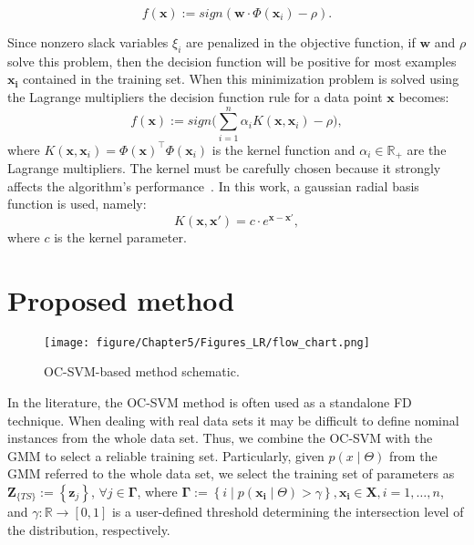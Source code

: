 \begin{equation}\label{eqn:decisor}
    f(\mathbf{x}) := sign(\mathbf{w} \cdot \Phi(\mathbf{x}_i)-\rho).
\end{equation}

Since nonzero slack variables $\xi_i$ are penalized in the objective function, if $\mathbf{w}$ and $\rho$ solve this problem, then the decision function will be positive for most examples $\mathbf{x_i}$ contained in the training set. When this minimization problem is solved using the Lagrange multipliers the decision function rule for a data point $\mathbf{x}$ becomes:
\begin{equation}\label{eqn:decisorLagrange}
f(\mathbf{x}) := sign\biggr(\sum_{i=1}^n \alpha_i K(\mathbf{x},\mathbf{x}_i)-\rho\biggl),
\end{equation}
where $K(\mathbf{x},\mathbf{x}_i)=\Phi(\mathbf{x})^{\top} \Phi(\mathbf{x}_i)$ is the kernel function and $\alpha_i \in \mathbb{R}_{+}$ are the Lagrange multipliers. The kernel must be carefully chosen because it strongly affects the algorithm's performance~\cite{muller2018introduction}. In this work, a gaussian radial basis function is used, namely:
\begin{equation*}
    K(\mathbf{x},\mathbf{x'})= c \cdot e^{{\mathbf{x}-\mathbf{x}'}},
\end{equation*}
where $c$ is the kernel parameter.
\section{Proposed method}
\begin{figure*}[ht!]
    \centering
    \texttt{[image: figure/Chapter5/Figures\_LR/flow\_chart.png]}
    \caption{OC-SVM-based method schematic.}\vspace{-0.2cm}
    \label{fig: flow}
\end{figure*}
 In the literature, the OC-SVM method is often used as a standalone FD technique. When dealing with real data sets it may be difficult to define nominal instances from the whole data set. Thus, we combine the OC-SVM with the GMM to select a reliable training set. Particularly, given $p(x \mid \Theta)$ from the GMM referred to the whole data set, we select the training set of parameters as $\mathbf{Z}_{\{T S\}}:=\left\{\mathbf{z}_j\right\}$, $\forall j \in \boldsymbol{\Gamma}$, where $\boldsymbol{\Gamma}:=\left\{i \mid p\left(\mathbf{x}_{\mathbf{i}} \mid \Theta\right)>\gamma\right\}, \mathbf{x}_{\mathbf{i}} \in \mathbf{X}, i=1, \ldots, n$, and $\gamma: \mathbb{R} \rightarrow[0,1]$ is a user-defined threshold determining the intersection level of the distribution, respectively.

